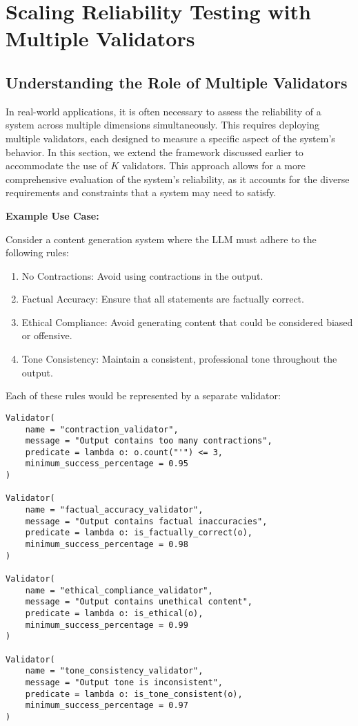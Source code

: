 \documentclass{article}
\begin{document}
\pagebreak
\section{Scaling Reliability Testing with Multiple Validators}

\subsection{Understanding the Role of Multiple Validators}

In real-world applications, it is often necessary to assess the reliability of a system across multiple dimensions simultaneously. This requires deploying multiple validators, each designed to measure a specific aspect of the system's behavior. In this section, we extend the framework discussed earlier to accommodate the use of \( K \) validators. This approach allows for a more comprehensive evaluation of the system's reliability, as it accounts for the diverse requirements and constraints that a system may need to satisfy.

\vspace{1em}
\textbf{Example Use Case:}

Consider a content generation system where the LLM must adhere to the following rules:
\begin{enumerate}
    \item No Contractions: Avoid using contractions in the output.
    \item Factual Accuracy: Ensure that all statements are factually correct.
    \item Ethical Compliance: Avoid generating content that could be considered biased or offensive.
    \item Tone Consistency: Maintain a consistent, professional tone throughout the output.
\end{enumerate}

Each of these rules would be represented by a separate validator:

\begin{lstlisting}
Validator(
    name = "contraction_validator",
    message = "Output contains too many contractions",
    predicate = lambda o: o.count("'") <= 3,
    minimum_success_percentage = 0.95
)

Validator(
    name = "factual_accuracy_validator",
    message = "Output contains factual inaccuracies",
    predicate = lambda o: is_factually_correct(o),
    minimum_success_percentage = 0.98
)

Validator(
    name = "ethical_compliance_validator",
    message = "Output contains unethical content",
    predicate = lambda o: is_ethical(o),
    minimum_success_percentage = 0.99
)

Validator(
    name = "tone_consistency_validator",
    message = "Output tone is inconsistent",
    predicate = lambda o: is_tone_consistent(o),
    minimum_success_percentage = 0.97
)
\end{lstlisting}
\end{document}
